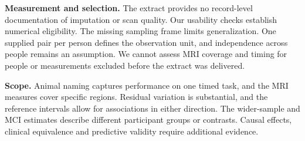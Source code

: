 \textbf{Measurement and selection.} The extract provides no record-level documentation of imputation or scan quality. Our usability checks establish numerical eligibility. The missing sampling frame limits generalization. One supplied pair per person defines the observation unit, and independence across people remains an assumption. We cannot assess MRI coverage and timing for people or measurements excluded before the extract was delivered.

\textbf{Scope.} Animal naming captures performance on one timed task, and the MRI measures cover specific regions. Residual variation is substantial, and the reference intervals allow for associations in either direction. The wider-sample and MCI estimates describe different participant groups or contrasts. Causal effects, clinical equivalence and predictive validity require additional evidence.
